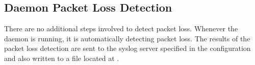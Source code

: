 \subsection{Daemon Packet Loss Detection}
There are no additional steps involved to detect packet loss. Whenever the daemon is running, it is automatically detecting packet loss. The results of the packet loss detection are sent to the syslog server specified in the configuration and also written to a file located at .

